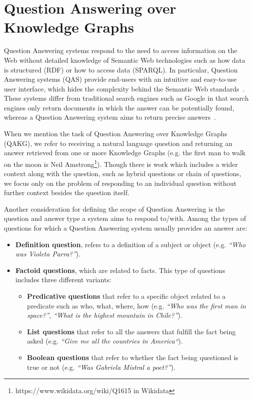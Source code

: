 \section{Question Answering over Knowledge Graphs}
Question Answering systems respond to the need to access information on the Web without 
detailed knowledge of Semantic Web technologies such as how data is structured (RDF) or how to 
access data (SPARQL). In particular, Question Answering systems (QAS) provide end-users with an 
intuitive and easy-to-use user interface, which hides the complexity behind the Semantic Web 
standards~\cite{qa:intro-UngerFC14}. These systems differ from traditional search engines such 
as Google in that search engines only return documents in which the answer can be potentially 
found, whereas a Question Answering system aims to return precise answers~\cite{qa:LopezUSM11}.

When we mention the task of Question Answering over Knowledge Graphs (QAKG), we refer to 
receiving a natural language question and returning an answer retrieved from one or more 
Knowledge Graphs (e.g. the first man to walk on the moon is Neil 
Amstrong\footnote{https://www.wikidata.org/wiki/Q1615 in Wikidata}). Though there is work which 
includes a wider context along with the question, such as hybrid questions or chain of questions, 
we focus only on the problem of responding to an individual question without further context 
besides the question itself.

Another consideration for defining the scope of Question Answering is the question and answer 
type a system aims to respond to/with. Among the types of questions for which a Question 
Answering system usually provides an answer are:

\begin{itemize}
    \item \textbf{Definition question}, refers to a definition of a subject or object (e.g. 
    \textit{“Who was Violeta Parra?”}).
    \item \textbf{Factoid questions}, which are related to facts. This type of questions 
    includes three different variants:
    \begin{itemize}
        \item \textbf{Predicative questions} that refer to a specific object related to a predicate 
        such as who, what, where, how (e.g. \textit{“Who was the first man in space?”}, 
        \textit{“What is the highest mountain in Chile?”}).
        \item \textbf{List questions} that refer to all the answers that fulfill the fact being 
        asked (e.g. \textit{“Give me all the countries in America“}).
        \item \textbf{Boolean questions} that refer to whether the fact being questioned is true 
        or not (e.g. \textit{“Was Gabriela Mistral a poet?”}).
    \end{itemize}
\end{itemize}


